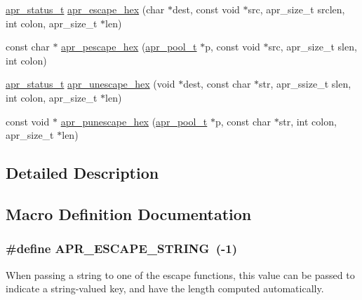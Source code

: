 \begin{DoxyCompactItemize}
\item 
\hyperlink{group__apr__errno_gaf76ee4543247e9fb3f3546203e590a6c}{apr\+\_\+status\+\_\+t} \hyperlink{group___a_p_r___util___escaping_gac87b3c2f42fb60f6ea4d8321e60ce69e}{apr\+\_\+escape\+\_\+hex} (char $\ast$dest, const void $\ast$src, apr\+\_\+size\+\_\+t srclen, int colon, apr\+\_\+size\+\_\+t $\ast$len)
\item 
const char $\ast$ \hyperlink{group___a_p_r___util___escaping_ga2a12cd35230cc148da52ea983da4b211}{apr\+\_\+pescape\+\_\+hex} (\hyperlink{group__apr__pools_gaf137f28edcf9a086cd6bc36c20d7cdfb}{apr\+\_\+pool\+\_\+t} $\ast$p, const void $\ast$src, apr\+\_\+size\+\_\+t slen, int colon)
\item 
\hyperlink{group__apr__errno_gaf76ee4543247e9fb3f3546203e590a6c}{apr\+\_\+status\+\_\+t} \hyperlink{group___a_p_r___util___escaping_ga98c3558219d7ce3dd29420c0124ddd73}{apr\+\_\+unescape\+\_\+hex} (void $\ast$dest, const char $\ast$str, apr\+\_\+ssize\+\_\+t slen, int colon, apr\+\_\+size\+\_\+t $\ast$len)
\item 
const void $\ast$ \hyperlink{group___a_p_r___util___escaping_ga8cba37bcacb5e1c9440f2b35d44afc49}{apr\+\_\+punescape\+\_\+hex} (\hyperlink{group__apr__pools_gaf137f28edcf9a086cd6bc36c20d7cdfb}{apr\+\_\+pool\+\_\+t} $\ast$p, const char $\ast$str, int colon, apr\+\_\+size\+\_\+t $\ast$len)
\end{DoxyCompactItemize}


\subsection{Detailed Description}


\subsection{Macro Definition Documentation}
\subsubsection[{\texorpdfstring{A\+P\+R\+\_\+\+E\+S\+C\+A\+P\+E\+\_\+\+S\+T\+R\+I\+NG}{APR_ESCAPE_STRING}}]{\setlength{\rightskip}{0pt plus 5cm}\#define A\+P\+R\+\_\+\+E\+S\+C\+A\+P\+E\+\_\+\+S\+T\+R\+I\+NG~(-\/1)}\hypertarget{group___a_p_r___util___escaping_ga793ae1b187ce490c65eeee2eb59d2831}{}\label{group___a_p_r___util___escaping_ga793ae1b187ce490c65eeee2eb59d2831}
When passing a string to one of the escape functions, this value can be passed to indicate a string-\/valued key, and have the length computed automatically. 

